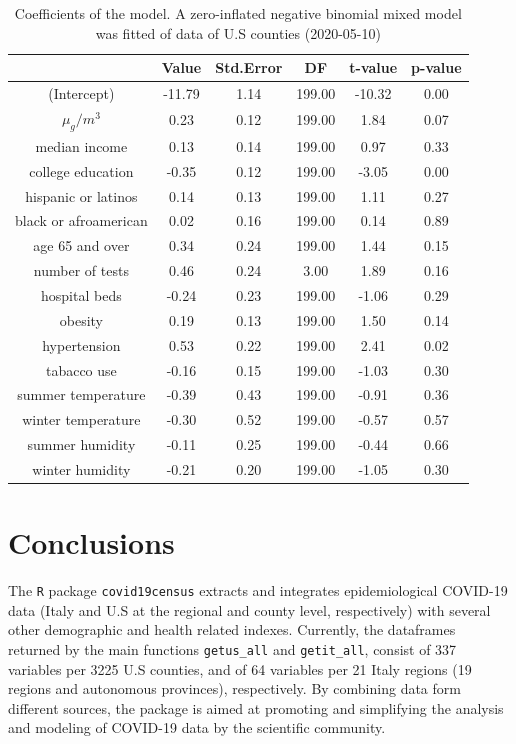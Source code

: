 \documentclass[12pt,halfline,a4paper,]{ouparticle}
\begin{document}
\begin{table}[ht]
\centering
\begin{tabular}{cccccc}
  \hline
 & Value & Std.Error & DF & t-value & p-value \\ 
  \hline
(Intercept) & -11.79 & 1.14 & 199.00 & -10.32 & 0.00 \\ 
  $\mu_g/m^3$ & 0.23 & 0.12 & 199.00 & 1.84 & 0.07 \\ 
  median income & 0.13 & 0.14 & 199.00 & 0.97 & 0.33 \\ 
  college education & -0.35 & 0.12 & 199.00 & -3.05 & 0.00 \\ 
  hispanic or latinos & 0.14 & 0.13 & 199.00 & 1.11 & 0.27 \\ 
  black or afroamerican & 0.02 & 0.16 & 199.00 & 0.14 & 0.89 \\ 
  age 65 and over & 0.34 & 0.24 & 199.00 & 1.44 & 0.15 \\ 
  number of tests & 0.46 & 0.24 & 3.00 & 1.89 & 0.16 \\ 
  hospital beds & -0.24 & 0.23 & 199.00 & -1.06 & 0.29 \\ 
  obesity & 0.19 & 0.13 & 199.00 & 1.50 & 0.14 \\ 
  hypertension & 0.53 & 0.22 & 199.00 & 2.41 & 0.02 \\ 
  tabacco use & -0.16 & 0.15 & 199.00 & -1.03 & 0.30 \\ 
  summer temperature & -0.39 & 0.43 & 199.00 & -0.91 & 0.36 \\ 
  winter temperature & -0.30 & 0.52 & 199.00 & -0.57 & 0.57 \\ 
  summer humidity & -0.11 & 0.25 & 199.00 & -0.44 & 0.66 \\ 
  winter humidity & -0.21 & 0.20 & 199.00 & -1.05 & 0.30 \\ 
   \hline
\end{tabular}
\caption{Coefficients of the model. A zero-inflated negative binomial mixed model was fitted of data of U.S counties (2020-05-10)} 
\label{tab:tab_coef}
\end{table}

\hypertarget{conclusions}{%
\section{Conclusions}\label{conclusions}}

The \texttt{R} package \texttt{covid19census} extracts and integrates
epidemiological COVID-19 data (Italy and U.S at the regional and county
level, respectively) with several other demographic and health related
indexes. Currently, the dataframes returned by the main functions
\texttt{getus\_all} and \texttt{getit\_all}, consist of 337 variables
per 3225 U.S counties, and of 64 variables per 21 Italy regions (19
regions and autonomous provinces), respectively. By combining data form
different sources, the package is aimed at promoting and simplifying the
analysis and modeling of COVID-19 data by the scientific community.
\end{document}
